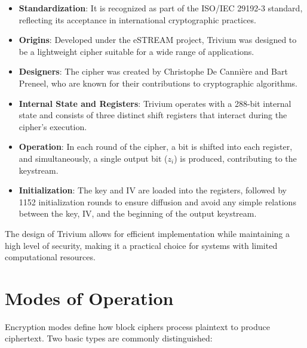 \documentclass[12pt]{article}
\begin{document}
\begin{itemize}
    \item \textbf{Standardization}: It is recognized as part of the ISO/IEC 29192-3 standard, reflecting its acceptance in international cryptographic practices.
    \item \textbf{Origins}: Developed under the eSTREAM project, Trivium was designed to be a lightweight cipher suitable for a wide range of applications.
    \item \textbf{Designers}: The cipher was created by Christophe De Cannière and Bart Preneel, who are known for their contributions to cryptographic algorithms.
    \item \textbf{Internal State and Registers}: Trivium operates with a 288-bit internal state and consists of three distinct shift registers that interact during the cipher's execution.
    \item \textbf{Operation}: In each round of the cipher, a bit is shifted into each register, and simultaneously, a single output bit (\( z_i \)) is produced, contributing to the keystream.
    \item \textbf{Initialization}: The key and IV are loaded into the registers, followed by 1152 initialization rounds to ensure diffusion and avoid any simple relations between the key, IV, and the beginning of the output keystream.
\end{itemize}

The design of Trivium allows for efficient implementation while maintaining a high level of security, making it a practical choice for systems with limited computational resources.


\section*{Modes of Operation}

Encryption modes define how block ciphers process plaintext to produce ciphertext. Two basic types are commonly distinguished:
\end{document}
